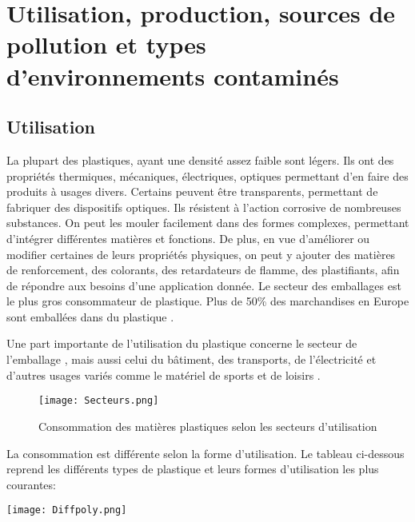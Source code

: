 \section{Utilisation, production, sources de pollution et types d'environnements contamin\'es}
\subsection{Utilisation}
\par{
La plupart des plastiques, ayant une densit\'e assez faible sont l\'egers. Ils ont des propri\'et\'es thermiques, m\'ecaniques, \'electriques, optiques permettant d'en faire des produits \`a usages divers. Certains peuvent \^etre transparents, permettant de fabriquer des dispositifs optiques. Ils r\'esistent \`a l'action corrosive de nombreuses substances. On peut les mouler facilement dans des formes complexes, permettant d'int\'egrer diff\'erentes mati\`eres et fonctions. De plus, en vue d'am\'eliorer ou modifier certaines de leurs propri\'et\'es physiques, on peut y ajouter des mati\`eres de renforcement, des colorants, des retardateurs de flamme, des plastifiants, afin de r\'epondre aux besoins d'une application donn\'ee. Le secteur des emballages est le plus gros consommateur de plastique. Plus de 50\% des marchandises en Europe sont emball\'ees dans du plastique {\citep{Plasticseurope2}}.
}
\par{
Une part importante de l'utilisation du plastique concerne le secteur de l'emballage , mais aussi celui du b\^atiment, des transports, de l'\'electricit\'e et d'autres usages vari\'es comme le mat\'eriel de sports et de loisirs {\citep{SCF}}.
}

\begin{figure}[h]
\centering
\texttt{[image: Secteurs.png]}
\caption{Consommation des mati\`eres plastiques selon les secteurs d'utilisation {\citep{SCF}}} 
\label{secteurs}
\end{figure}
\FloatBarrier

\par{
La consommation est diff\'erente selon la forme d'utilisation. Le tableau ci-dessous reprend les diff\'erents types de plastique et leurs formes d'utilisation les plus courantes:
}

\begin{table}[h]
\centering
\texttt{[image: Diffpoly.png]}
\caption{Les diff\'erents types de polym\`eres et leurs principales utilisations {\citep{Schafer2015}}} 
\label{diffpoly}
\end{table}
\FloatBarrier

